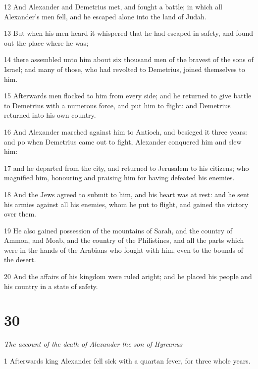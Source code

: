 \par 12 And Alexander and Demetrius met, and fought a battle; in which all Alexander’s men fell, and he escaped alone into the land of Judah. 

\par 13 But when his men heard it whispered that he had escaped in safety, and found out the place where he was; 

\par 14 there assembled unto him about six thousand men of the bravest of the sons of Israel; and many of those, who had revolted to Demetrius, joined themselves to him. 

\par 15 Afterwards men flocked to him from every side; and he returned to give battle to Demetrius with a numerous force, and put him to flight: and Demetrius returned into his own country. 

\par 16 And Alexander marched against him to Antioch, and besieged it three years: and po when Demetrius came out to fight, Alexander conquered him and slew him: 

\par 17 and he departed from the city, and returned to Jerusalem to his citizens; who magnified him, honouring and praising him for having defeated his enemies. 

\par 18 And the Jews agreed to submit to him, and his heart was at rest: and he sent his armies against all his enemies, whom he put to flight, and gained the victory over them. 

\par 19 He also gained possession of the mountains of Sarah, and the country of Ammon, and Moab, and the country of the Philistines, and all the parts which were in the hands of the Arabians who fought with him, even to the bounds of the desert. 

\par 20 And the affairs of his kingdom were ruled aright; and he placed his people and his country in a state of safety. 

\chapter{30}

\par \textit{The account of the death of Alexander the son of Hyrcanus}

\par 1 Afterwards king Alexander fell sick with a quartan fever, for three whole years. 

